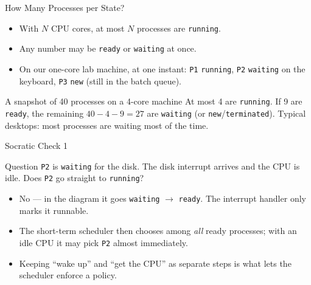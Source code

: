 \documentclass[aspectratio=169]{beamer}
\begin{document}
\begin{frame}{How Many Processes per State?}
  \begin{itemize}
    \item With $N$ CPU cores, at most $N$ processes are \texttt{running}.
    \item Any number may be \texttt{ready} or \texttt{waiting} at once.
    \item On our one-core lab machine, at one instant: \texttt{P1}
      \texttt{running}, \texttt{P2} \texttt{waiting} on the keyboard,
      \texttt{P3} \texttt{new} (still in the batch queue).
  \end{itemize}
  \vspace{0.2cm}
  \begin{exampleblock}{A snapshot of 40 processes on a 4-core machine}
    At most 4 are \texttt{running}. If 9 are \texttt{ready}, the remaining
    $40 - 4 - 9 = 27$ are \texttt{waiting} (or \texttt{new}/\texttt{terminated}).
    Typical desktops: most processes are waiting most of the time.
  \end{exampleblock}
\end{frame}

\begin{frame}{Socratic Check 1}
  \begin{block}{Question}
    \texttt{P2} is \texttt{waiting} for the disk. The disk interrupt arrives
    and the CPU is idle. Does \texttt{P2} go straight to \texttt{running}?
  \end{block}
  \vspace{0.25cm}
  \begin{itemize}
    \item No --- in the diagram it goes \texttt{waiting} $\to$
      \texttt{ready}. The interrupt handler only marks it runnable.
    \item The short-term scheduler then chooses among \emph{all} ready
      processes; with an idle CPU it may pick \texttt{P2} almost immediately.
    \item Keeping ``wake up'' and ``get the CPU'' as separate steps is what
      lets the scheduler enforce a policy.
  \end{itemize}
\end{frame}
\end{document}
